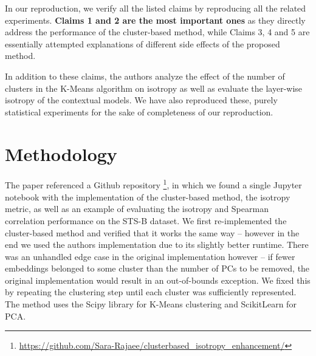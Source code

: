 In our reproduction, we verify all the listed claims by reproducing all the related experiments. \textbf{Claims 1 and 2 are the most important ones} as they directly address the performance of the cluster-based method, while Claims 3, 4 and 5 are essentially  attempted explanations of different side effects of the proposed method.

In addition to these claims, the authors analyze the effect of the number of clusters in the K-Means algorithm on isotropy as well as evaluate the layer-wise isotropy of the contextual models. We have also reproduced these, purely statistical experiments for the sake of completeness of our reproduction.  



\section{Methodology}

The paper referenced a Github repository \footnote{\url{https://github.com/Sara-Rajaee/clusterbased_isotropy_enhancement/}}, in which we found a single Jupyter notebook with the implementation of the cluster-based method, the isotropy metric, as well as an example of evaluating the isotropy and Spearman correlation performance on the STS-B dataset. We first re-implemented the cluster-based method and verified that it works the same way -- however in the end we used the authors implementation due to its slightly better runtime. There was an unhandled edge case in the original implementation however -- if fewer embeddings belonged to some cluster than the number of PCs to be removed, the original implementation would result in an out-of-bounds exception. We fixed this by repeating the clustering step until each cluster was sufficiently represented. The method uses the Scipy library for K-Means clustering and ScikitLearn for PCA. 

